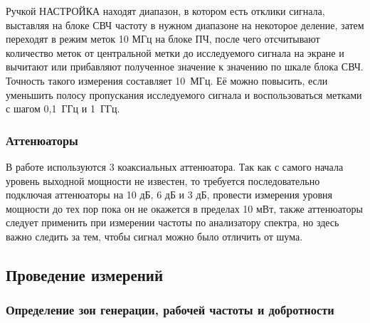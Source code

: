 \documentclass[a4paper,14pt]{extarticle}
\begin{document}
	Ручкой НАСТРОЙКА находят диапазон, в котором есть отклики сигнала, выставляя на блоке СВЧ частоту в нужном диапазоне на некоторое деление, затем переходят в режим меток 10 МГц на блоке ПЧ, после чего отсчитывают количество меток от центральной метки до исследуемого сигнала на экране и вычитают или прибавляют полученное значение к значению по шкале блока СВЧ. Точность такого измерения составляет 10~МГц. Её можно повысить, если уменьшить полосу пропускания исследуемого сигнала и воспользоваться метками с шагом 0,1~ГГц и 1~ГГц.
	
	\subsubsection{Аттенюаторы}
	
	В работе используются 3 коаксиальных аттенюатора. Так как с самого начала уровень выходной мощности не известен, то требуется последовательно подключая аттенюаторы на 10 дБ, 6 дБ и 3 дБ, провести измерения уровня мощности до тех пор пока он не окажется в пределах 10 мВт, также аттенюаторы следует применить при измерении частоты по анализатору спектра, но здесь важно следить за тем, чтобы сигнал можно было отличить от шума. 

	\subsection{Проведение измерений}

	\subsubsection{Определение зон генерации, рабочей частоты и добротности}
	
\end{document}
